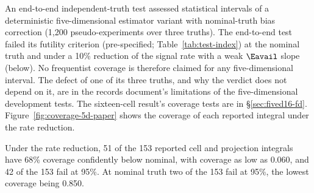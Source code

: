 An end-to-end independent-truth test assessed statistical intervals of a deterministic five-dimensional estimator variant with nominal-truth bias correction (1,200 pseudo-experiments over three truths). The end-to-end test failed its futility criterion (pre-specified; Table~\ref{tab:test-index}) at the nominal truth and under a 10\% reduction of the signal rate with a weak $\Eavail$ slope (below). No frequentist coverage is therefore claimed for any five-dimensional interval. The defect of one of its three truths, and why the verdict does not depend on it, are in the records document's limitations of the five-dimensional development tests. The sixteen-cell result's coverage tests are in \S\ref{sec:fived16-fd}. Figure~\ref{fig:coverage-5d-paper} shows the coverage of each reported integral under the rate reduction.

Under the rate reduction, 51 of the 153 reported cell and projection integrals have 68\% coverage confidently below nominal, with coverage as low as 0.060, and 42 of the 153 fail at 95\%. At nominal truth two of the 153 fail at 95\%, the lowest coverage being 0.850.

